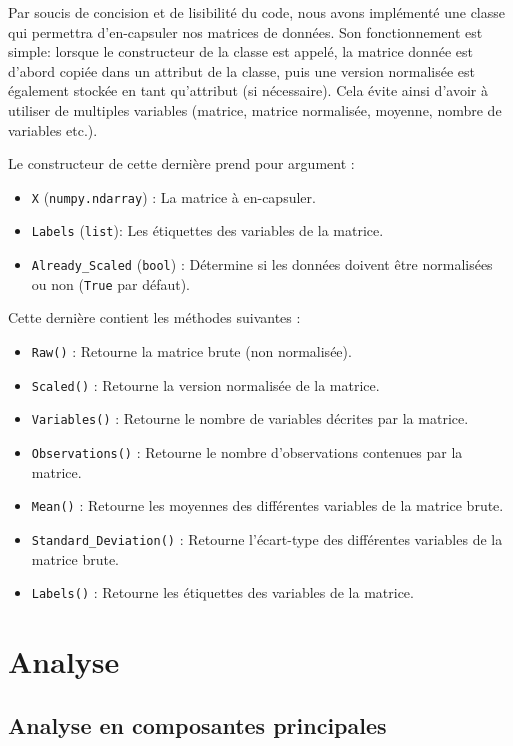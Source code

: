 \documentclass[a4paper, 12pt]{report}
\newcommand{\pythoninline}[1]{\texttt{#1}}
\begin{document}
Par soucis de concision et de lisibilité du code, nous avons implémenté une classe qui permettra d'en-capsuler nos matrices de données. Son fonctionnement est simple: lorsque le constructeur de la classe est appelé, la matrice donnée est d'abord copiée dans un attribut de la classe, puis une version normalisée est également stockée en tant qu'attribut (si nécessaire). Cela évite ainsi d'avoir à utiliser de multiples variables (matrice, matrice normalisée, moyenne, nombre de variables etc.).

Le constructeur de cette dernière prend pour argument :
\begin{itemize}
    \item \pythoninline{X} (\pythoninline{numpy.ndarray}) : La matrice à en-capsuler.
    \item \pythoninline{Labels}  (\pythoninline{list}): Les étiquettes des variables de la matrice.
    \item \pythoninline{Already_Scaled}  (\pythoninline{bool}) : Détermine si les données doivent être normalisées ou non (\pythoninline{True} par défaut).
\end{itemize}

Cette dernière contient les méthodes suivantes :
\begin{itemize}
    \item \pythoninline{Raw()} : Retourne la matrice brute (non normalisée).
    \item \pythoninline{Scaled()} : Retourne la version normalisée de la matrice.
    \item \pythoninline{Variables()} : Retourne le nombre de variables décrites par la matrice.
    \item \pythoninline{Observations()} : Retourne le nombre d'observations contenues par la matrice.
    \item \pythoninline{Mean()} : Retourne les moyennes des différentes variables de la matrice brute.
    \item \pythoninline{Standard_Deviation()} : Retourne l'écart-type des différentes variables de la matrice brute.
    \item \pythoninline{Labels()} : Retourne les étiquettes des variables de la matrice.
\end{itemize}


\chapter{Analyse}

\section{Analyse en composantes principales}
\end{document}
